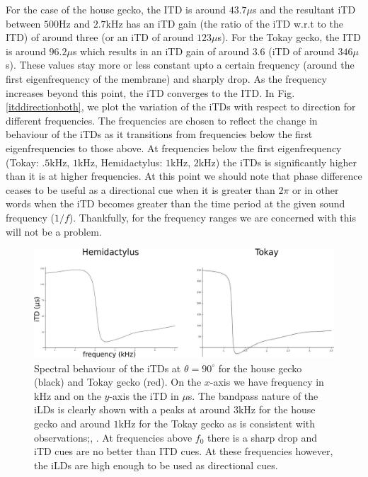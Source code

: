 For the case of the house gecko, the ITD is around $43.7\mu$s and the resultant iTD between 
$500$Hz and $2.7$kHz has an iTD gain (the ratio of the iTD  w.r.t to the ITD)  of around three (or an iTD of around $123\mu$s). For the Tokay gecko, the ITD is around $96.2\mu$s which results in an iTD
gain of around $3.6$ (iTD of around $346\mu$s). These values stay more or less constant upto a certain frequency (around the first eigenfrequency of the membrane) and
sharply drop. As the frequency increases beyond this point, the iTD converges to the ITD. In Fig. \ref{itddirectionboth}, we plot the variation of the iTDs
with respect to direction for different frequencies. The frequencies are chosen to reflect the change in behaviour of the iTDs as it transitions from frequencies
below the first eigenfrequencies to those above. At frequencies below the first eigenfrequency (Tokay: $.5$kHz, $1$kHz, Hemidactylus: $1$kHz, $2$kHz) the iTDs
is significantly higher than it is at higher frequencies. At this point we should note that phase difference ceases to be useful as a directional cue when it is
greater than $2\pi$ or in other words when the iTD becomes greater than the time period at the given sound frequency ($1/f$). Thankfully, for the frequency ranges we are concerned with this will not be a problem.

\begin{figure}[ht!]
\centering
  \includegraphics[width=1.0\linewidth]{Diagrams/Plots/iTD/both.png}
  \caption[Spectral behavior of the iTDs.]{Spectral behaviour of the iTDs at $\theta=90^\circ$ for the house gecko (black) and Tokay gecko (red). On the $x$-axis we have frequency in kHz and on the $y$-axis the iTD in $\mu$s.
  The bandpass nature of the iLDs is clearly shown with a peaks at around $3$kHz for the house gecko and around $1$kHz for the Tokay gecko as is consistent with observations;\cite{dalsgaardmanley1}, \cite{dalsgaardmanley2}.
  At frequencies above $f_0$ there is a sharp drop and iTD cues are no better than ITD cues. At these frequencies however, the iLDs are high enough to be used as directional cues.}
  \label{iTDboth}
\end{figure}

